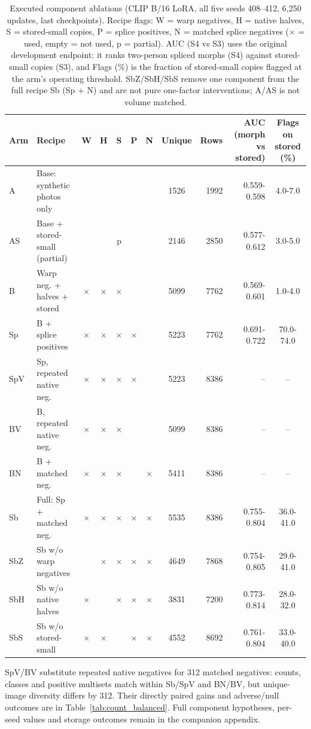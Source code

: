     \begin{table}[t]
    \centering\small
    \caption{Executed component ablations (CLIP B/16 LoRA, all five seeds 408--412, 6,250 updates, last checkpoints). Recipe flags: W = warp negatives, H = native halves, S = stored-small copies, P = splice positives, N = matched splice negatives ($\times$ = used, empty = not used, p = partial). AUC (S4 vs S3) uses the original development endpoint: it ranks two-person spliced morphs (S4) against stored-small copies (S3), and Flags (\%) is the fraction of stored-small copies flagged at the arm's operating threshold. SbZ/SbH/SbS remove one component from the full recipe Sb (Sp + N) and are not pure one-factor interventions; A/AS is not volume matched.}
    \label{tab:executed_components}
    \begin{tabular}{llccccccrrc}
    \toprule
    Arm & Recipe & W & H & S & P & N & Unique & Rows & AUC (morph vs stored) & Flags on stored (\%) \\
    \midrule
    A & Base: synthetic photos only & & & & & & 1526 & 1992 & 0.559-0.598 & 4.0-7.0 \\
    AS & Base + stored-small (partial) & & & p & & & 2146 & 2850 & 0.577-0.612 & 3.0-5.0 \\
    B & Warp neg. + halves + stored & $\times$ & $\times$ & $\times$ & & & 5099 & 7762 & 0.569-0.601 & 1.0-4.0 \\
    Sp & B + splice positives & $\times$ & $\times$ & $\times$ & $\times$ & & 5223 & 7762 & 0.691-0.722 & 70.0-74.0 \\
    SpV & Sp, repeated native neg. & $\times$ & $\times$ & $\times$ & $\times$ & & 5223 & 8386 & -- & -- \\
    BV & B, repeated native neg. & $\times$ & $\times$ & $\times$ & & & 5099 & 8386 & -- & -- \\
    BN & B + matched neg. & $\times$ & $\times$ & $\times$ & & $\times$ & 5411 & 8386 & -- & -- \\
    Sb & Full: Sp + matched neg. & $\times$ & $\times$ & $\times$ & $\times$ & $\times$ & 5535 & 8386 & 0.755-0.804 & 36.0-41.0 \\
    SbZ & Sb w/o warp negatives & & $\times$ & $\times$ & $\times$ & $\times$ & 4649 & 7868 & 0.754-0.805 & 29.0-41.0 \\
    SbH & Sb w/o native halves & $\times$ & & $\times$ & $\times$ & $\times$ & 3831 & 7200 & 0.773-0.814 & 28.0-32.0 \\
    SbS & Sb w/o stored-small & $\times$ & $\times$ & & $\times$ & $\times$ & 4552 & 8692 & 0.761-0.804 & 33.0-40.0 \\
    \bottomrule
    \end{tabular}
    \par\smallskip\raggedright
    SpV/BV substitute repeated native negatives for 312 matched negatives: counts, classes and positive multisets match within Sb/SpV and BN/BV, but unique-image diversity differs by 312. Their directly paired gains and adverse/null outcomes are in Table~\ref{tab:count_balanced}. Full component hypotheses, per-seed values and storage outcomes remain in the companion appendix.
    \end{table}
    
